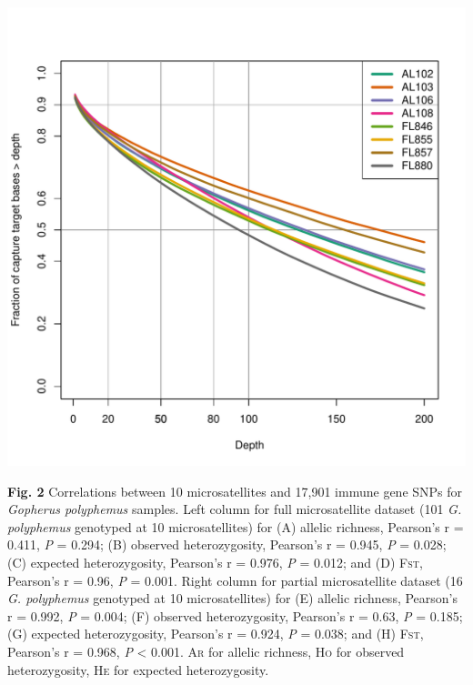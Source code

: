 \documentclass[english]{article}\usepackage[]{graphicx}\usepackage[]{color}
\makeatletter
\def\maxwidth{ %
  \ifdim\Gin@nat@width>\linewidth
    \linewidth
  \else
    \Gin@nat@width
  \fi
}
\newenvironment{knitrout}{}{} %
\makeatother
\begin{document}
\pagebreak{}
\noindent
\begin{knitrout}
\color{fgcolor}
\includegraphics[width=\maxwidth]{figure/Figure-2-1} 

\end{knitrout}
\noindent
\textbf{Fig. 2} Correlations between 10 microsatellites and 17,901 immune gene SNPs for \textit{Gopherus polyphemus} samples. Left column for full microsatellite dataset (101 \textit{G. polyphemus} genotyped at 10 microsatellites) for (A) allelic richness, Pearson's r = 0.411, \textit{P} = 0.294; (B) observed heterozygosity, Pearson's r = 0.945, \textit{P} = 0.028; (C) expected heterozygosity, Pearson's r = 0.976, \textit{P} = 0.012; and (D) \textsc{Fst}, Pearson's r = 0.96, \textit{P} = 0.001. Right column for partial microsatellite dataset (16 \textit{G. polyphemus} genotyped at 10 microsatellites) for (E) allelic richness, Pearson's r = 0.992, \textit{P} = 0.004; (F) observed heterozygosity, Pearson's r = 0.63, \textit{P} = 0.185; (G) expected heterozygosity, Pearson's r = 0.924, \textit{P} = 0.038; and (H) \textsc{Fst}, Pearson's r = 0.968, \textit{P} < 0.001. \textsc{Ar} for allelic richness, \textsc{Ho} for observed heterozygosity, \textsc{He} for expected heterozygosity. \\
\end{document}
